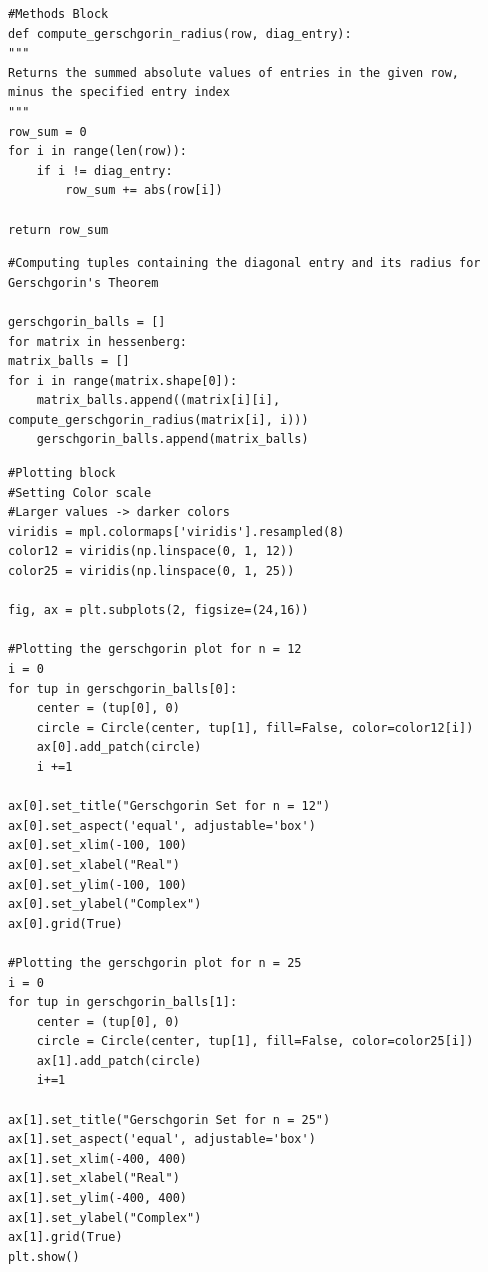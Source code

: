 \begin{solution}
\begin{lstlisting}
#Methods Block
def compute_gerschgorin_radius(row, diag_entry):
"""
Returns the summed absolute values of entries in the given row, 
minus the specified entry index
"""
row_sum = 0
for i in range(len(row)):
    if i != diag_entry:
        row_sum += abs(row[i])
        
return row_sum
\end{lstlisting}

\begin{lstlisting}
#Computing tuples containing the diagonal entry and its radius for Gerschgorin's Theorem

gerschgorin_balls = []
for matrix in hessenberg:
matrix_balls = []
for i in range(matrix.shape[0]):
    matrix_balls.append((matrix[i][i], compute_gerschgorin_radius(matrix[i], i)))
    gerschgorin_balls.append(matrix_balls)
\end{lstlisting}

\begin{lstlisting}
#Plotting block
#Setting Color scale
#Larger values -> darker colors
viridis = mpl.colormaps['viridis'].resampled(8)
color12 = viridis(np.linspace(0, 1, 12))
color25 = viridis(np.linspace(0, 1, 25))

fig, ax = plt.subplots(2, figsize=(24,16))

#Plotting the gerschgorin plot for n = 12
i = 0
for tup in gerschgorin_balls[0]:
    center = (tup[0], 0)
    circle = Circle(center, tup[1], fill=False, color=color12[i])
    ax[0].add_patch(circle)
    i +=1

ax[0].set_title("Gerschgorin Set for n = 12")
ax[0].set_aspect('equal', adjustable='box')
ax[0].set_xlim(-100, 100)
ax[0].set_xlabel("Real")
ax[0].set_ylim(-100, 100)
ax[0].set_ylabel("Complex")
ax[0].grid(True)  

#Plotting the gerschgorin plot for n = 25
i = 0
for tup in gerschgorin_balls[1]:
    center = (tup[0], 0)
    circle = Circle(center, tup[1], fill=False, color=color25[i])
    ax[1].add_patch(circle)
    i+=1
    
ax[1].set_title("Gerschgorin Set for n = 25")
ax[1].set_aspect('equal', adjustable='box')
ax[1].set_xlim(-400, 400)
ax[1].set_xlabel("Real")
ax[1].set_ylim(-400, 400)
ax[1].set_ylabel("Complex")
ax[1].grid(True)  
plt.show()
\end{lstlisting}
\end{solution}

